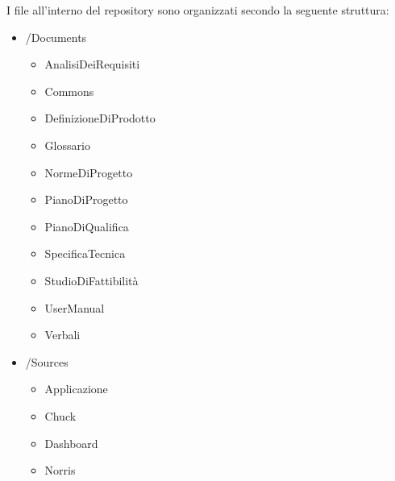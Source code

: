 					I file all’interno del repository sono organizzati secondo la seguente struttura:
					\begin{itemize}
						\item /Documents
						\begin{itemize}
							\item AnalisiDeiRequisiti
							\item Commons
							\item DefinizioneDiProdotto
							\item Glossario
							\item NormeDiProgetto
							\item PianoDiProgetto
							\item PianoDiQualifica
							\item SpecificaTecnica
							\item StudioDiFattibilità
							\item UserManual
							\item Verbali
						\end{itemize}
						\item /Sources
						\begin{itemize}
							\item Applicazione
							\item Chuck
							\item Dashboard
							\item Norris
						\end{itemize}
					\end{itemize}



